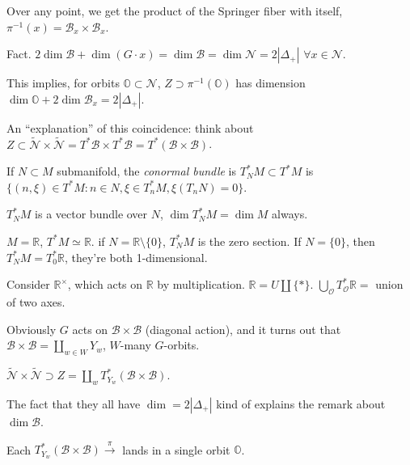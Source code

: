 Over any point, we get the
product of the Springer fiber with itself,
$\pi^{-1}(x) = \mathcal{B}_x
\times \mathcal{B}_x$.

\noindent
Fact. $2 \dim \mathcal{B}+
\dim(G\cdot x) = \dim \mathcal{B}
= \dim \mathcal{N}=2 |\Delta_+|$
$\forall x \in \mathcal{N}$.

This implies, for orbits
$\mathbb{O} \subset \mathcal{N}$,
$Z \supset\pi^{-1}(\mathbb{O})$
has dimension $\dim \mathbb{O}
+ 2 \dim \mathcal{B}_x=
2 |\Delta_+|$.

An ``explanation'' of this coincidence:
think about $Z \subset \widetilde{
\mathcal{N}}\times \widetilde{\mathcal{N}}
=T^* \mathcal{B} \times T^*\mathcal{B}
=T^*(\mathcal{B}\times \mathcal{B})$.

\begin{definition}
\label{definition-conormal-bundle}
If $N \subset M$ submanifold,
the {\it conormal bundle} is
$T^*_NM \subset T^*M$ is 
$\{(n,\xi) \in T^*M:
n \in N, \xi \in T^*_n M,
\xi(T_n N) = 0\}$.
\end{definition}

\noindent
$T^*_NM$ is a vector bundle over $N$,
$\dim T^*_NM= \dim M$ always.

\begin{example}
\label{example-conormal-bundle-r}
$M= \mathbb{R}$, $T^*M \simeq \mathbb{R}$.
if $N= \mathbb{R}\setminus\{0\}$,
$T^*_NM$ is the zero section.
If $N = \{0\}$, then $T^*_NM =
T^*_0\mathbb{R}$,
they're both 1-dimensional.
\end{example}

\noindent
Consider $\mathbb{R}^{\times}$,
which acts on $\mathbb{R}$ by multiplication.
$\mathbb{R} = U \coprod \{*\}$.
$\bigcup_{\mathcal{O}}T^*_{\mathcal{O}}
\mathbb{R}=$ union of two axes.

\medskip\noindent
Obviously $G$ acts on $\mathcal{B}\times
\mathcal{B}$ (diagonal action),
and it turns out that
$\mathcal{B}\times\mathcal{B}=\coprod_{w \in
W}Y_w$, $W$-many $G$-orbits.

\begin{proposition}
\label{proposition-union-of-conormal-bdls}
$\widetilde{\mathcal{N}}\times
\widetilde{\mathcal{N}}\supset Z
= \coprod_{w}T^*_{Y_w}
(\mathcal{B}\times\mathcal{B})$.
\end{proposition}

\noindent
The fact that they all have $\dim
= 2 |\Delta_+|$ kind of explains the
remark about $\dim \mathcal{B}$.

\begin{exercise}
\label{exercise-lands-in-single-orbit}
Each $T^*_{Y_w}(\mathcal{B} \times \mathcal{B})
\xrightarrow{\pi}$ lands in 
a single orbit $\mathbb{O}$.
\end{exercise}


